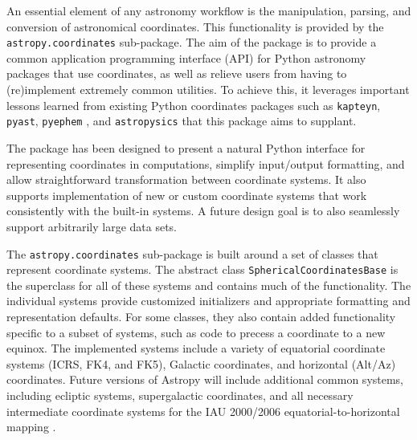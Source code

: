 \documentclass[traditabstract]{aa}
\begin{document}


An essential element of any astronomy workflow is the manipulation, parsing,
and conversion of astronomical coordinates. This functionality is provided by
the \texttt{astropy.coordinates} sub-package. The aim of the package is to
provide a common application programming interface (API) for Python astronomy
packages that use coordinates, as well as relieve users from having to
(re)implement extremely common utilities. To achieve this, it leverages
important lessons learned from existing Python coordinates packages such as
\texttt{kapteyn}, \texttt{pyast}, \texttt{pyephem} \citep{pyephem}, and
\texttt{astropysics} \citep{astropysics} that this package aims to supplant.

The package has been designed to present a natural Python interface for
representing coordinates in computations, simplify input/output formatting,
and allow straightforward transformation between coordinate systems. It also
supports implementation of new or custom coordinate systems that work
consistently with the built-in systems. A future design goal is to also
seamlessly support arbitrarily large data sets.



The \texttt{astropy.coordinates} sub-package is built around a set of classes
that represent coordinate systems. The abstract class
\texttt{SphericalCoordinatesBase} is the superclass for all of these systems
and contains much of the functionality. The individual systems provide
customized initializers and appropriate formatting and representation
defaults. For some classes, they also contain added functionality specific to
a subset of systems, such as code to precess a coordinate to a new equinox.
The implemented systems include a variety of equatorial coordinate systems
(ICRS, FK4, and FK5), Galactic coordinates, and horizontal (Alt/Az)
coordinates. Future versions of Astropy will include additional common
systems, including ecliptic systems, supergalactic coordinates, and all
necessary intermediate coordinate systems for the IAU 2000/2006
equatorial-to-horizontal mapping \citep[e.g.,][]{soffel03, usnocircular179}.


\end{document}
